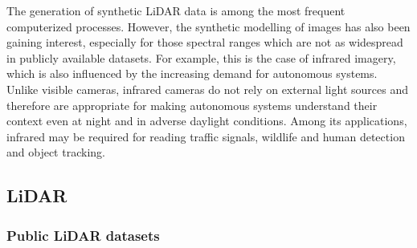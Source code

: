The generation of synthetic LiDAR data is among the most frequent computerized processes. However, the synthetic modelling of images has also been gaining interest, especially for those spectral ranges which are not as widespread in publicly available datasets. For example, this is the case of infrared imagery, which is also influenced by the increasing demand for autonomous systems. Unlike visible cameras, infrared cameras do not rely on external light sources and therefore are appropriate for making autonomous systems understand their context even at night and in adverse daylight conditions. Among its applications, infrared may be required for reading traffic signals, wildlife and human detection and object tracking. 

\subsection{LiDAR}

\subsubsection{Public LiDAR datasets}


